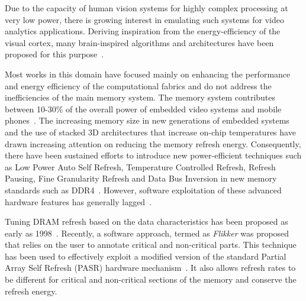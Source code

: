 
Due to the capacity of human vision systems for highly complex processing at very low power, there is growing interest in emulating such systems for video analytics applications.
Deriving inspiration from the energy-efficiency of the visual cortex, many brain-inspired algorithms and architectures have been proposed for this purpose~\cite{Nere2011,Chen2014,Kestur2012}. %



Most works in this domain have focused mainly on enhancing the performance and energy efficiency of the computational fabrics and do not address the inefficiencies of the main memory system. The memory system contributes between 10-30\% of the overall power of embedded video systems and mobile phones~\cite{CarrollAaronHeiser2010}. 
The increasing memory size in new generations of embedded systems and the use of stacked 3D architectures that increase on-chip temperatures have drawn increasing attention on reducing the memory refresh energy. Consequently, there have been sustained efforts to introduce new power-efficient techniques such as Low Power Auto Self Refresh, Temperature Controlled Refresh, Refresh Pausing, Fine Granularity Refresh and Data Bus Inversion in new memory standards such as DDR4~\cite{jedec-sdram-standards}.  However, software exploitation of these advanced hardware features has generally lagged~\cite{Mukundan2013,refresh-pausing-taco2014}. 

Tuning DRAM refresh based on the data characteristics has been proposed as early as 1998~\cite{islped98}. Recently, a software approach, termed as \emph{Flikker} was proposed that relies on the user to annotate critical and non-critical parts. This technique has been used to effectively exploit a modified version of the standard Partial Array Self Refresh (PASR) hardware mechanism~\cite{Liu2011}. It also allows refresh rates to be different for critical and non-critical sections of the memory and conserve the refresh energy. 

